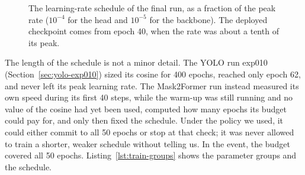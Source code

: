 \begin{figure}[t]
\centering
{}
\caption{The learning-rate schedule of the final run, as a fraction of the peak rate ($10^{-4}$ for
the head and $10^{-5}$ for the backbone). The deployed checkpoint comes from epoch 40, when the rate
was about a tenth of its peak. }
\label{fig:train-schedule}
\end{figure}

The length of the schedule is not a minor detail. The YOLO run exp010 (Section~\ref{sec:yolo-exp010})
sized its cosine for 400 epochs, reached only epoch 62, and never left its peak learning rate. The
Mask2Former run instead measured its own speed during its first 40 steps, while the warm-up was still
running and no value of the cosine had yet been used, computed how many epochs its budget could pay
for, and only then fixed the schedule. Under the policy we used, it could either commit to all 50
epochs or stop at that check; it was never allowed to train a shorter, weaker schedule without
telling us. In the event, the budget covered all 50 epochs. Listing~\ref{lst:train-groups} shows the
parameter groups and the schedule.

